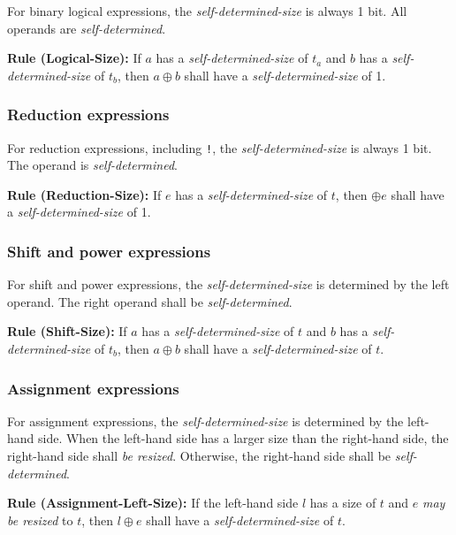 \documentclass{article}
\newcommand{\sds}{\emph{self-determined-size}}
\newcommand{\mbr}{\emph{may be resized}}
\newenvironment{typingrule}[1]%
{\par\noindent\textbf{Rule (#1):} }%
{\par}
\begin{document}
For binary logical expressions, the \sds{} is always 1 bit.
All operands are \emph{self-determined}.

\begin{typingrule}{Logical-Size}
  If $a$ has a \sds{} of $t_{a}$ and $b$ has a
  \sds{} of $t_{b}$, then $a \oplus b$ shall have a
  \sds{} of 1.
\end{typingrule}

\subsubsection{Reduction expressions}%
\label{reduction-expressions}

For reduction expressions, including \texttt{!}, the \sds{}
is always 1 bit. The operand is \emph{self-determined}.

\begin{typingrule}{Reduction-Size}
  If $e$ has a \sds{} of $t$, then $\oplus e$ shall have a
  \sds{} of 1.
\end{typingrule}

\subsubsection{Shift and power expressions}%
\label{shift-and-power-expressions}

For shift and power expressions, the \sds{} is determined
by the left operand. The right operand shall be \emph{self-determined}.

\begin{typingrule}{Shift-Size}
  If $a$ has a \sds{} of $t$ and $b$ has a
  \sds{} of $t_{b}$, then $a \oplus b$ shall have a
  \sds{} of $t$.
\end{typingrule}

\subsubsection{Assignment expressions}%
\label{assignment-expressions}

For assignment expressions, the \sds{} is determined by the
left-hand side. When the left-hand side has a larger size than the right-hand
side, the right-hand side shall \emph{be resized}. Otherwise, the right-hand
side shall be \emph{self-determined}.

\begin{typingrule}{Assignment-Left-Size}
  If the left-hand side $l$ has a size of $t$ and $e$ \mbr{} to
  $t$, then $l \oplus e$ shall have a \sds{} of $t$.
\end{typingrule}
\end{document}

